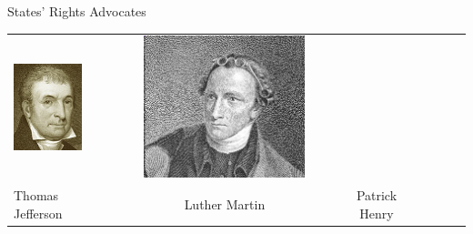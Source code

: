 \begin{frame}{States' Rights Advocates}
\begin{table}[h]
\begin{tabular}{lcccccc}
    \includegraphics[width=0.75\textwidth,height=.3\textheight,keepaspectratio=true]{img/luther-martin.png} &
    \includegraphics[width=0.75\textwidth,height=.3\textheight,keepaspectratio=true]{img/patrick-henry.png} \\
    Thomas Jefferson &
    Luther Martin &
    Patrick Henry \\

\end{tabular}
\end{table}
\end{frame}
